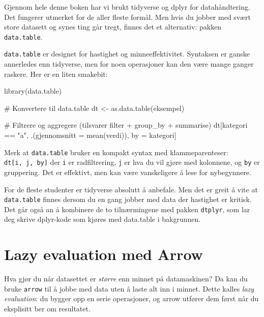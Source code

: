 \documentclass[
  norsk,
  letterpaper,
  DIV=11,
  numbers=noendperiod]{scrreprt}
\newenvironment{Shaded}{\begin{snugshade}}{\end{snugshade}}
\newcommand{\AttributeTok}[1]{\textcolor[rgb]{0.40,0.45,0.13}{#1}}
\newcommand{\CommentTok}[1]{\textcolor[rgb]{0.37,0.37,0.37}{#1}}
\newcommand{\FunctionTok}[1]{\textcolor[rgb]{0.28,0.35,0.67}{#1}}
\newcommand{\NormalTok}[1]{\textcolor[rgb]{0.00,0.23,0.31}{#1}}
\newcommand{\OtherTok}[1]{\textcolor[rgb]{0.00,0.23,0.31}{#1}}
\newcommand{\SpecialCharTok}[1]{\textcolor[rgb]{0.37,0.37,0.37}{#1}}
\newcommand{\StringTok}[1]{\textcolor[rgb]{0.13,0.47,0.30}{#1}}
\theoremstyle{definition}
\theoremstyle{remark}
\begin{document}
Gjennom hele denne boken har vi brukt tidyverse og dplyr for
datahåndtering. Det fungerer utmerket for de aller fleste formål. Men
hvis du jobber med svært store datasett og synes ting går tregt, finnes
det et alternativ: pakken \texttt{data.table}.

\texttt{data.table} er designet for hastighet og minneeffektivitet.
Syntaksen er ganske annerledes enn tidyverse, men for noen operasjoner
kan den være mange ganger raskere. Her er en liten smakebit:

\begin{Shaded}
\begin{Highlighting}[]
\FunctionTok{library}\NormalTok{(data.table)}

\CommentTok{\# Konvertere til data.table}
\NormalTok{dt }\OtherTok{\textless{}{-}} \FunctionTok{as.data.table}\NormalTok{(eksempel)}

\CommentTok{\# Filtrere og aggregere (tilsvarer filter + group\_by + summarise)}
\NormalTok{dt[kategori }\SpecialCharTok{==} \StringTok{"a"}\NormalTok{, .(}\AttributeTok{gjennomsnitt =} \FunctionTok{mean}\NormalTok{(verdi)), by }\OtherTok{=}\NormalTok{ kategori]}
\end{Highlighting}
\end{Shaded}

Merk at \texttt{data.table} bruker en kompakt syntax med
klammeparenteser: \texttt{dt{[}i,\ j,\ by{]}} der \texttt{i} er
radfiltrering, \texttt{j} er hva du vil gjøre med kolonnene, og
\texttt{by} er gruppering. Det er effektivt, men kan være vanskeligere å
lese for nybegynnere.

For de fleste studenter er tidyverse absolutt å anbefale. Men det er
greit å vite at \texttt{data.table} finnes dersom du en gang jobber med
data der hastighet er kritisk. Det går også an å kombinere de to
tilnærmingene med pakken \texttt{dtplyr}, som lar deg skrive dplyr-kode
som kjøres med data.table i bakgrunnen.

\section{Lazy evaluation med Arrow}\label{lazy-evaluation-med-arrow}

Hva gjør du når datasettet er \emph{større} enn minnet på datamaskinen?
Da kan du bruke \texttt{arrow} til å jobbe med data uten å laste alt inn
i minnet. Dette kalles \emph{lazy evaluation}: du bygger opp en serie
operasjoner, og arrow utfører dem først når du eksplisitt ber om
resultatet.
\end{document}
